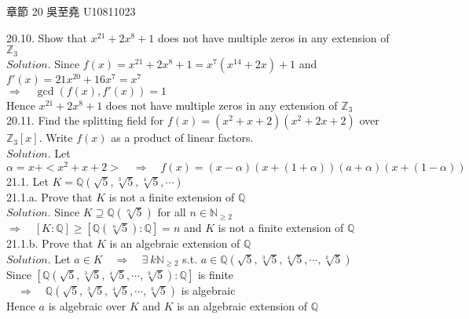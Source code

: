 \documentclass[12pt]{book}
\author{andersonwu2000}
\begin{document}
\begin{CJK}{UTF8}{bsmi}

\hfill 章節 20 吳至堯 U10811023

20.10. Show that $x^{21}+2x^8+1$ does not have multiple zeros in any extension of $\mathbb{Z}_3$ \\
$Solution$. Since $f(x)=x^{21}+2x^8+1=x^7(x^{14}+2x)+1$ and $f'(x)=21x^{20}+16x^7=x^7$ \\
$\Rightarrow\quad\gcd(f(x), f'(x))=1$ \\
Hence $x^{21}+2x^8+1$ does not have multiple zeros in any extension of $\mathbb{Z}_3$ \\

20.11. Find the splitting field for $f(x)=(x^2+x+2)(x^2+2x+2)$ over $\mathbb{Z}_3\left[x\right]$. Write $f(x)$ as a product of linear factors. \\
$Solution$. Let $\alpha=x+<x^2+x+2>\quad\Rightarrow\quad f(x)=(x-\alpha)(x+(1+\alpha))(a+\alpha)(x+(1-\alpha))$ \\

21.1. Let $K=\mathbb{Q}(\sqrt{5}, \sqrt[3]{5}, \sqrt[4]{5}, \cdots)$ \\

21.1.a. Prove that $K$ is not a finite extension of $\mathbb{Q}$ \\
$Solution$. Since $K\supseteq\mathbb{Q}(\sqrt[n]{5})$ for all $n\in\mathbb{N}_{\ge2}$ \\
$\Rightarrow\quad\left [ K:\mathbb{Q} \right ]\ge\left [ \mathbb{Q}(\sqrt[n]{5}):\mathbb{Q} \right ] = n$ and $K$ is not a finite extension of $\mathbb{Q}$ \\

21.1.b. Prove that $K$ is an algebraic extension of $\mathbb{Q}$ \\
$Solution$. Let $a\in K\quad\Rightarrow\quad\exists\ k\mathbb{N}_{\ge2}$ s.t. $a\in\mathbb{Q}(\sqrt{5}, \sqrt[3]{5}, \sqrt[4]{5}, \cdots, \sqrt[k]{5})$ \\
Since $\left [ \mathbb{Q}(\sqrt{5}, \sqrt[3]{5}, \sqrt[4]{5}, \cdots, \sqrt[k]{5}):\mathbb{Q} \right ]$ is finite $\quad\Rightarrow\quad\mathbb{Q}(\sqrt{5}, \sqrt[3]{5}, \sqrt[4]{5}, \cdots, \sqrt[k]{5})$ is algebraic \\
Hence $a$ is algebraic over $K$ and $K$ is an algebraic extension of $\mathbb{Q}$ \\

\end{CJK}
\end{document}
